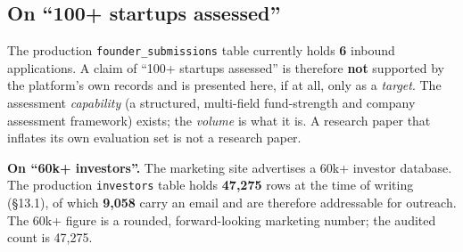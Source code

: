 \documentclass[11pt]{article}
\newcommand{\note}[1]{\par\noindent\colorbox{gray!8}{\parbox{0.97\linewidth}{\small #1}}\par\medskip}
\begin{document}
\subsection{On ``100+ startups assessed''}
The production \texttt{founder\_submissions} table currently holds \textbf{6}
inbound applications. A claim of ``100+ startups assessed'' is therefore
\textbf{not} supported by the platform's own records and is presented here, if at
all, only as a \emph{target}. The assessment \emph{capability} (a structured,
multi-field fund-strength and company assessment framework) exists; the
\emph{volume} is what it is. A research paper that inflates its own evaluation set
is not a research paper.

\note{\textbf{On ``60k+ investors''.} The marketing site advertises a 60k+
investor database. The production \texttt{investors} table holds \textbf{47{,}275}
rows at the time of writing (\S13.1), of which \textbf{9{,}058} carry an email and
are therefore addressable for outreach. The 60k+ figure is a rounded,
forward-looking marketing number; the audited count is 47{,}275.}
\end{document}

